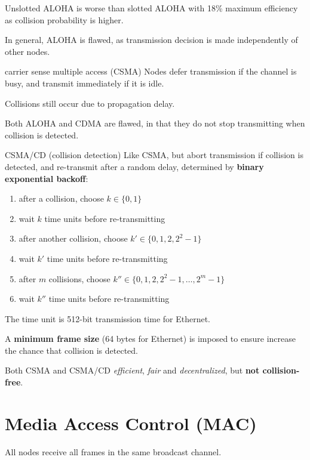 Unslotted ALOHA is worse than slotted ALOHA with 18\% maximum efficiency as collision probability
is higher.

In general, ALOHA is flawed, as transmission decision is made independently of other nodes.

\begin{defn}{carrier sense multiple access (CSMA)}
    Nodes defer transmission if the channel is busy, and transmit immediately if it is idle.
\end{defn}

Collisions still occur due to propagation delay.

Both ALOHA and CDMA are flawed, in that they do not stop transmitting when collision is detected.

\begin{defn}{CSMA/CD (collision detection)}
    Like CSMA, but abort transmission if collision is detected, and re-transmit after a random delay,
    determined by \textbf{binary exponential backoff}:

    \begin{enumerate}
        \item after a collision, choose $k \in \{0, 1\}$
        \item wait $k$ time units before re-transmitting
        \item after another collision, choose $k' \in \{0, 1, 2, 2^2 - 1\}$
        \item wait $k'$ time units before re-transmitting
        \item after $m$ collisions, choose $k'' \in \{0, 1, 2, 2^2 - 1, \dots, 2^m - 1\}$
        \item wait $k''$ time units before re-transmitting
    \end{enumerate}

    The time unit is 512-bit transmission time for Ethernet.

    A \textbf{minimum frame size} (64 bytes for Ethernet) is imposed to ensure increase
    the chance that collision is detected.
\end{defn}

Both CSMA and CSMA/CD \textit{efficient}, \textit{fair} and \textit{decentralized},
but \textbf{not collision-free}.


\section{Media Access Control (MAC)}
All nodes receive all frames in the same broadcast channel.

